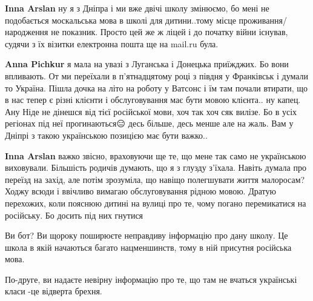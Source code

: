 \begin{itemize}
\begin{itemize}
\begin{itemize}
\textbf{Inna Arslan} ну я з Дніпра і ми вже двічі школу змінюємо, бо мені не
подобається москальська мова в школі для дитини..тому місце
проживання/народження не показник. Просто цей же ж ліцей і до початку війни
існував, судячи з їх візитки електронна пошта ще на mail.ru була.

 
\textbf{Anna Pichkur} я мала на увазі з Луганська і Донецька приїжджих. Бо вони
впливають. От ми переїхали в п'ятнадцятому році з півдня у Франківськ і думали
то Україна. Пішла дочка на літо на роботу у Ватсонс і їм там почали втирати, що
в нас тепер є різні клієнти і обслуговування має бути мовою клієнта.. ну капец.
Ану Ніде не дінешся від тієї російської мови, хоч так хоч сяк вилізе. Бо в усіх
регіонах під неї прогинаються😑 десь більше, десь менше але на жаль. Вам у
Дніпрі з такою українською позицією має бути важко..

 
\textbf{Inna Arslan} важко звісно, враховуючи ще те, що мене так само не
українською виховували. Більшість родичів думають, що я з глузду з'їхала.
Навіть думала про переїзд на захід, але потім зрозуміла, що навіщо полегшувати
життя малоросам? Ходжу всюди і ввічливо вимагаю обслуговування рідною мовою.
Дратую перехожих, коли пояснюю дитині на вулиці про те, чому погано
перемикатися на російську. Бо досить під них гнутися

\end{itemize}

 

Ви бот? Ви щороку поширюєте неправдиву інформацію про дану школу. Це школа в
якій начаються багато нацменшинств, тому в ній присутня російська мова.

По-друге, ви надаєте невірну інформацію про те, що там не вчаться українські
класи -це відверта брехня.


\end{itemize}
\end{itemize}
